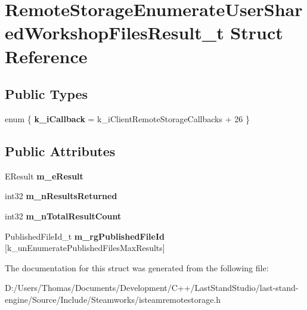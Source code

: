 \hypertarget{structRemoteStorageEnumerateUserSharedWorkshopFilesResult__t}{}\section{Remote\+Storage\+Enumerate\+User\+Shared\+Workshop\+Files\+Result\+\_\+t Struct Reference}
\label{structRemoteStorageEnumerateUserSharedWorkshopFilesResult__t}
\subsection*{Public Types}
\begin{DoxyCompactItemize}
\item 
\hypertarget{structRemoteStorageEnumerateUserSharedWorkshopFilesResult__t_a539123e59b69ed116d2dc4ac7ab51a44}{}enum \{ {\bfseries k\+\_\+i\+Callback} = k\+\_\+i\+Client\+Remote\+Storage\+Callbacks + 26
 \}\label{structRemoteStorageEnumerateUserSharedWorkshopFilesResult__t_a539123e59b69ed116d2dc4ac7ab51a44}

\end{DoxyCompactItemize}
\subsection*{Public Attributes}
\begin{DoxyCompactItemize}
\item 
\hypertarget{structRemoteStorageEnumerateUserSharedWorkshopFilesResult__t_a61cbb5eb5e4d011b53fd20bb6bafd60a}{}E\+Result {\bfseries m\+\_\+e\+Result}\label{structRemoteStorageEnumerateUserSharedWorkshopFilesResult__t_a61cbb5eb5e4d011b53fd20bb6bafd60a}

\item 
\hypertarget{structRemoteStorageEnumerateUserSharedWorkshopFilesResult__t_a8d2e79f84e4b9ebc3dfb45f6cf58d487}{}int32 {\bfseries m\+\_\+n\+Results\+Returned}\label{structRemoteStorageEnumerateUserSharedWorkshopFilesResult__t_a8d2e79f84e4b9ebc3dfb45f6cf58d487}

\item 
\hypertarget{structRemoteStorageEnumerateUserSharedWorkshopFilesResult__t_a997ccd0c38d02a652834cb165baa0a1e}{}int32 {\bfseries m\+\_\+n\+Total\+Result\+Count}\label{structRemoteStorageEnumerateUserSharedWorkshopFilesResult__t_a997ccd0c38d02a652834cb165baa0a1e}

\item 
\hypertarget{structRemoteStorageEnumerateUserSharedWorkshopFilesResult__t_ada4b529f90e609a326dab331b0afa2b4}{}Published\+File\+Id\+\_\+t {\bfseries m\+\_\+rg\+Published\+File\+Id} \mbox{[}k\+\_\+un\+Enumerate\+Published\+Files\+Max\+Results\mbox{]}\label{structRemoteStorageEnumerateUserSharedWorkshopFilesResult__t_ada4b529f90e609a326dab331b0afa2b4}

\end{DoxyCompactItemize}


The documentation for this struct was generated from the following file\+:\begin{DoxyCompactItemize}
\item 
D\+:/\+Users/\+Thomas/\+Documents/\+Development/\+C++/\+Last\+Stand\+Studio/last-\/stand-\/engine/\+Source/\+Include/\+Steamworks/isteamremotestorage.\+h\end{DoxyCompactItemize}
